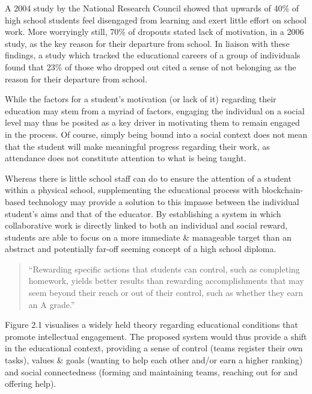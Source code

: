 \documentclass[12pt]{report}
\begin{document}
A 2004 study by the National Research Council showed that upwards of
40\% of high school students feel disengaged from learning and exert
little effort on school work\cite{Usher2013}. More worryingly still, 70\% of dropouts stated
lack of motivation, in a 2006 study, as the key reason for their
departure from school\cite{bridgeland2006silent}. In liaison with these
findings, a study which tracked the educational careers of a group of
individuals found that 23\% of those who dropped out cited a sense of
not belonging as the reason for their departure from school\cite{berktold1998subsequent}.

While the factors for a student's motivation (or lack of it) regarding
their education may stem from a myriad of factors, engaging the
individual on a social level may thus be posited as a key driver in
motivating them to remain engaged in the process\cite{johnson2001students}. Of course, simply being
bound into a social context does not mean that the student will make
meaningful progress regarding their work, as attendance does not
constitute attention to what is being taught.

Whereas there is little school staff can do to ensure the attention of a
student within a physical school, supplementing the educational process
with blockchain-based technology may provide a solution to this impasse
between the individual student's aims and that of the educator. By
establishing a system in which collaborative work is directly linked to
both an individual and social reward, students are able to focus on a
more immediate \& manageable target than an abstract and potentially
far-off seeming concept of a high school diploma.

\begin{quote}
``Rewarding specific actions that students can control, such as
completing homework, yields better results than rewarding
accomplishments that may seem beyond their reach or out of their
control, such as whether they earn an A grade.''\cite{Usher2013}
\end{quote}

Figure 2.1 visualises a widely held theory regarding educational
conditions that promote intellectual engagement\cite{CommitteeonIncreasingHighSchoolStudentsEngagementandMotivationtoLearn2003}. The proposed system would thus provide
a shift in the educational context, providing a sense of control (teams
register their own tasks), values \& goals (wanting to help each other
and/or earn a higher ranking) and social connectedness (forming and
maintaining teams, reaching out for and offering help).
\end{document}
